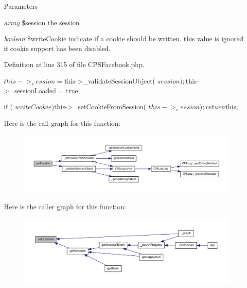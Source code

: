 \begin{DoxyParams}{Parameters}
\item[{\em array}]\$session the session \item[{\em boolean}]\$writeCookie indicate if a cookie should be written. this value is ignored if cookie support has been disabled. \end{DoxyParams}


Definition at line 315 of file CPSFacebook.php.




\begin{DoxyCode}
    {
        $this->_session = $this->_validateSessionObject( $session );
        $this->_sessionLoaded = true;

        if ( $writeCookie ) $this->_setCookieFromSession( $this->_session );

        return $this;
    }
\end{DoxyCode}




Here is the call graph for this function:\nopagebreak
\begin{figure}[H]
\begin{center}
\leavevmode
\includegraphics[width=400pt]{classCPSFacebook_a83fd4ea8255385abd72c27a762691e2d_cgraph}
\end{center}
\end{figure}




Here is the caller graph for this function:\nopagebreak
\begin{figure}[H]
\begin{center}
\leavevmode
\includegraphics[width=400pt]{classCPSFacebook_a83fd4ea8255385abd72c27a762691e2d_icgraph}
\end{center}
\end{figure}


